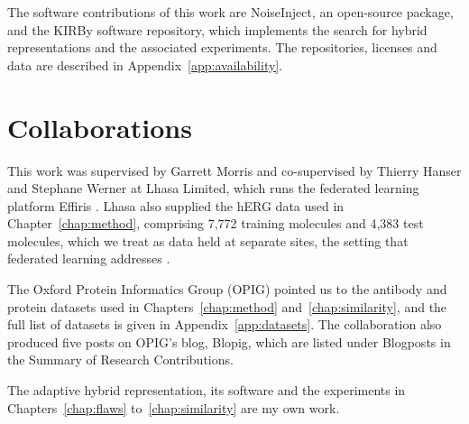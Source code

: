 The software contributions of this work are NoiseInject, an open-source package, and the KIRBy software repository, which implements the search for hybrid representations and the associated experiments. The repositories, licenses and data are described in Appendix~\ref{app:availability}.


\section{Collaborations}


This work was supervised by Garrett Morris and co-supervised by Thierry Hanser and Stephane Werner at Lhasa Limited, which runs the federated learning platform Effiris \citep{Bassani2023}. Lhasa also supplied the hERG data used in Chapter~\ref{chap:method}, comprising 7,772 training molecules and 4,383 test molecules, which we treat as data held at separate sites, the setting that federated learning addresses \citep{Bassani2023, Hanser2023}.

The Oxford Protein Informatics Group (OPIG) pointed us to the antibody and protein datasets used in Chapters~\ref{chap:method} and~\ref{chap:similarity}, and the full list of datasets is given in Appendix~\ref{app:datasets}. The collaboration also produced five posts on OPIG's blog, Blopig, which are listed under Blogposts in the Summary of Research Contributions.

The adaptive hybrid representation, its software and the experiments in Chapters~\ref{chap:flaws} to~\ref{chap:similarity} are my own work.



\pagebreak
